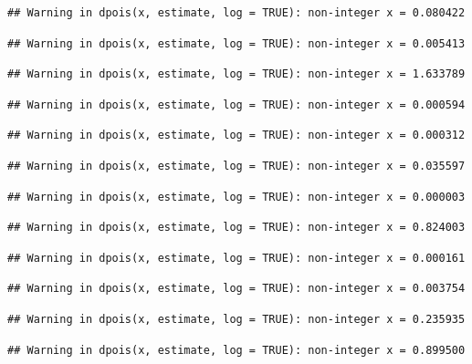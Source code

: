 \documentclass[]{article}
\begin{document}
\begin{verbatim}
## Warning in dpois(x, estimate, log = TRUE): non-integer x = 0.080422
\end{verbatim}

\begin{verbatim}
## Warning in dpois(x, estimate, log = TRUE): non-integer x = 0.005413
\end{verbatim}

\begin{verbatim}
## Warning in dpois(x, estimate, log = TRUE): non-integer x = 1.633789
\end{verbatim}

\begin{verbatim}
## Warning in dpois(x, estimate, log = TRUE): non-integer x = 0.000594
\end{verbatim}

\begin{verbatim}
## Warning in dpois(x, estimate, log = TRUE): non-integer x = 0.000312
\end{verbatim}

\begin{verbatim}
## Warning in dpois(x, estimate, log = TRUE): non-integer x = 0.035597
\end{verbatim}

\begin{verbatim}
## Warning in dpois(x, estimate, log = TRUE): non-integer x = 0.000003
\end{verbatim}

\begin{verbatim}
## Warning in dpois(x, estimate, log = TRUE): non-integer x = 0.824003
\end{verbatim}

\begin{verbatim}
## Warning in dpois(x, estimate, log = TRUE): non-integer x = 0.000161
\end{verbatim}

\begin{verbatim}
## Warning in dpois(x, estimate, log = TRUE): non-integer x = 0.003754
\end{verbatim}

\begin{verbatim}
## Warning in dpois(x, estimate, log = TRUE): non-integer x = 0.235935
\end{verbatim}

\begin{verbatim}
## Warning in dpois(x, estimate, log = TRUE): non-integer x = 0.899500
\end{verbatim}
\end{document}
